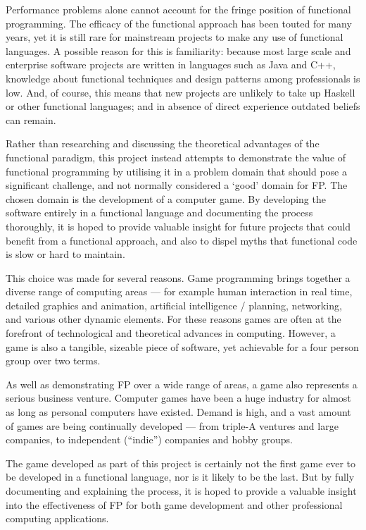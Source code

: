 Performance problems alone cannot account for the fringe position of functional programming. The efficacy of the functional approach has been touted for many years, yet it is still rare for mainstream projects to make any use of functional languages. A possible reason for this is familiarity: because most large scale and enterprise software projects are written in languages such as Java and C++, knowledge about functional techniques and design patterns among professionals is low. And, of course, this means that new projects are unlikely to take up Haskell or other functional languages; and in absence of direct experience outdated beliefs can remain.

Rather than researching and discussing the theoretical advantages of the functional paradigm, this project instead attempts to demonstrate the value of functional programming by utilising it in a problem domain that should pose a significant challenge, and not normally considered a `good' domain for FP. The chosen domain is the development of a computer game. By developing the software entirely in a functional language and documenting the process thoroughly, it is hoped to provide valuable insight for future projects that could benefit from a functional approach, and also to dispel myths that functional code is slow or hard to maintain.

This choice was made for several reasons. Game programming brings together a diverse range of computing areas --- for example human interaction in real time, detailed graphics and animation, artificial intelligence / planning, networking, and various other dynamic elements. For these reasons games are often at the forefront of technological and theoretical advances in computing. However, a game is also a tangible, sizeable piece of software, yet achievable for a four person group over two terms. 

As well as demonstrating FP over a wide range of areas, a game also represents a serious business venture.\cite[1em]{essentialFacts2012} Computer games have been a huge industry for almost as long as personal computers have existed. Demand is high, and a vast amount of games are being continually developed --- from triple-A ventures and large companies, to independent (``indie'') companies and hobby groups.

The game developed as part of this project is certainly not the first game ever to be developed in a functional language, nor is it likely to be the last. But by fully documenting and explaining the process, it is hoped to provide a valuable insight into the effectiveness of FP for both game development and other professional computing applications.

